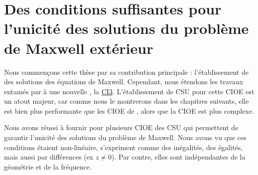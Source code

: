 \chapter[Des CSU des solutions du problème de Maxwell extérieur]{Des conditions suffisantes pour l'unicité des solutions du problème de Maxwell extérieur}
\label{sec:csu}
\minitoc
\newpage
{}
Nous commençons cette thèse par sa contribution principale : l'établissement de  des solutions des équations de Maxwell.
Cependant, nous étendons les travaux entamés par \cite{stupfel_sufficient_2011} à une nouvelle , la \hyperlink{ci3}{CI3}. L'établissement de CSU pour cette CIOE est un atout majeur, car comme nous le montrerons dans les chapitres suivants, elle est bien plus performante que les CIOE de \cite{stupfel_sufficient_2011}, alors que la CIOE est plus complexe.




Nous avons réussi à fournir pour plusieurs CIOE des CSU qui permettent de garantir l'unicité des solutions du problème de Maxwell. Nous avons vu que ces conditions étaient non-linéaire, s'expriment comme des inégalités, des égalités, mais aussi par différences (ex \(z\not=0\)). Par contre, elles sont indépendantes de la géométrie et de la fréquence.